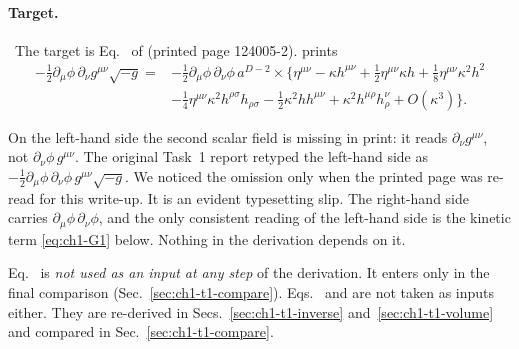 \paragraph{Target.} \tP\ The target is Eq.~ of \PI{} (printed page
124005-2). \PI{} prints
\begin{equation*}
\begin{aligned}
-\tfrac12\partial_\mu\phi\,\partial_\nu g^{\mu\nu}\sqrt{-g}
={}& -\tfrac12\partial_\mu\phi\,\partial_\nu\phi\,a^{D-2}
\times\Big\{\eta^{\mu\nu}-\kappa h^{\mu\nu}+\tfrac12\eta^{\mu\nu}\kappa h
+\tfrac18\eta^{\mu\nu}\kappa^2h^2\\
&-\tfrac14\eta^{\mu\nu}\kappa^2h^{\rho\sigma}h_{\rho\sigma}
-\tfrac12\kappa^2hh^{\mu\nu}+\kappa^2h^{\mu\rho}h^{\nu}_{\rho}+O(\kappa^3)\Big\}.
\end{aligned}
\end{equation*}
\begin{notebox}
On the left-hand side the second scalar field is missing in print: it reads
$\partial_\nu g^{\mu\nu}$, not $\partial_\nu\phi\,g^{\mu\nu}$. The original Task~1
report retyped the left-hand side as
$-\tfrac12\partial_\mu\phi\,\partial_\nu\phi\,g^{\mu\nu}\sqrt{-g}$. We noticed the
omission only when the printed page was re-read for this write-up. It is an
evident typesetting slip. The right-hand side carries
$\partial_\mu\phi\,\partial_\nu\phi$, and the only consistent reading of the
left-hand side is the kinetic term \eqref{eq:ch1-G1} below. Nothing in the
derivation depends on it.
\end{notebox}
Eq.~ is \emph{not used as an input at any step} of the derivation. It
enters only in the final comparison (Sec.~\ref{sec:ch1-t1-compare}). Eqs.~
and  are not taken as inputs either. They are re-derived in
Secs.~\ref{sec:ch1-t1-inverse} and~\ref{sec:ch1-t1-volume} and compared in
Sec.~\ref{sec:ch1-t1-compare}.

